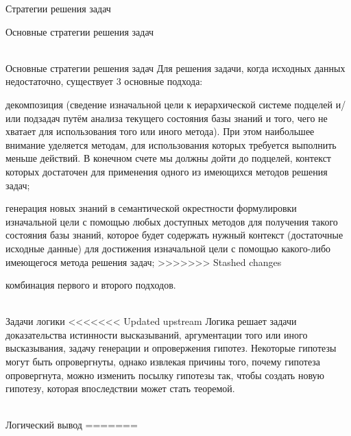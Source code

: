 \begin{frame}{Стратегии решения задач}
\begin{frame}{\large Основные стратегии решения задач}
\begin{textitemize}
\begin{frame}{\\Основные стратегии решения задач}
        Для решения задачи, когда исходных данных недостаточно, существует 3 основные подхода:
        \begin{textitemize}
            \item декомпозиция (сведение изначальной цели к иерархической системе подцелей и/или подзадач путём анализа текущего состояния базы знаний и того, чего не хватает для использования того или иного метода). При этом наибольшее внимание уделяется методам, для использования которых требуется выполнить меньше действий. В конечном счете мы должны дойти до подцелей, контекст которых достаточен для применения одного из имеющихся методов решения задач;
            \item генерация новых знаний в семантической окрестности формулировки изначальной цели с помощью любых доступных методов для получения такого состояния базы знаний, которое будет содержать нужный контекст (достаточные исходные данные) для достижения изначальной цели с помощью какого-либо имеющегося метода решения задач;
>>>>>>> Stashed changes
            \item комбинация первого и второго подходов.
        \end{textitemize}
\end{frame}

\begin{frame}{\\Задачи логики}
<<<<<<< Updated upstream
        Логика решает задачи доказательства истинности высказываний, аргументации того или иного высказывания, задачу генерации и опровержения гипотез. Некоторые гипотезы могут быть опровергнуты, однако извлекая причины того, почему гипотеза опровергнута, можно изменить посылку гипотезы так, чтобы создать новую гипотезу, которая впоследствии может стать теоремой.
\end{frame}

\begin{frame}{\\Логический вывод}
    \vspace{10mm}
=======
\topline
\vspace{30}
 \\
 

\end{frame}
\end{textitemize}
\end{frame}
\end{frame}
